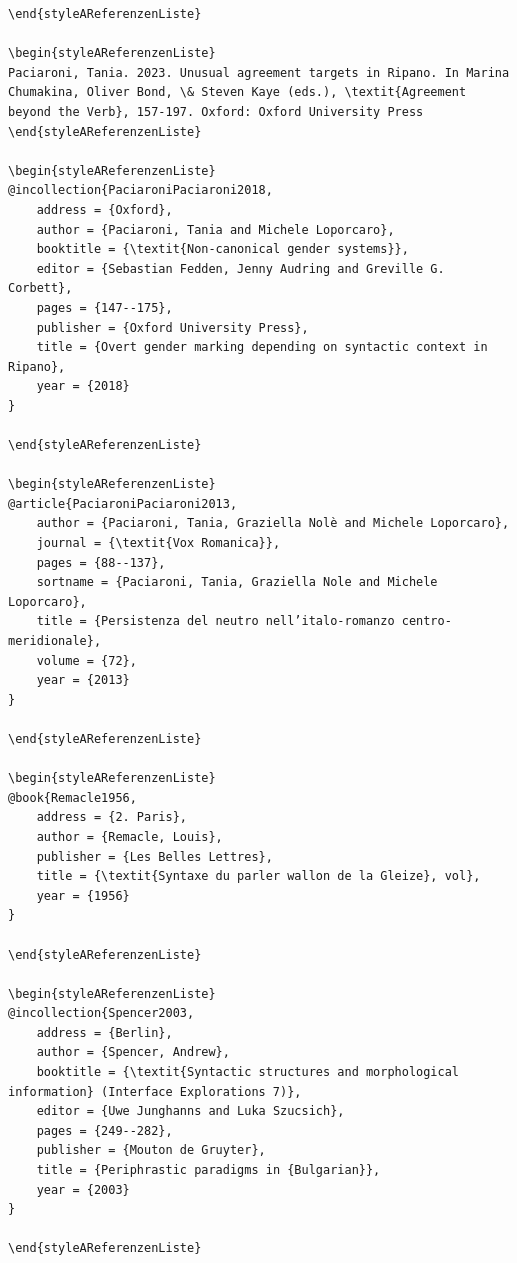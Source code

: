 \documentclass[output=paper]{langscibook}
\begin{document}
\begin{styleBiblio}
\begin{verbatim}
\end{styleAReferenzenListe}

\begin{styleAReferenzenListe}
Paciaroni, Tania. 2023. Unusual agreement targets in Ripano. In Marina Chumakina, Oliver Bond, \& Steven Kaye (eds.), \textit{Agreement beyond the Verb}, 157-197. Oxford: Oxford University Press
\end{styleAReferenzenListe}

\begin{styleAReferenzenListe}
@incollection{PaciaroniPaciaroni2018,
	address = {Oxford},
	author = {Paciaroni, Tania and Michele Loporcaro},
	booktitle = {\textit{Non-canonical gender systems}},
	editor = {Sebastian Fedden, Jenny Audring and Greville G. Corbett},
	pages = {147--175},
	publisher = {Oxford University Press},
	title = {Overt gender marking depending on syntactic context in Ripano},
	year = {2018}
}

\end{styleAReferenzenListe}

\begin{styleAReferenzenListe}
@article{PaciaroniPaciaroni2013,
	author = {Paciaroni, Tania, Graziella Nolè and Michele Loporcaro},
	journal = {\textit{Vox Romanica}},
	pages = {88--137},
	sortname = {Paciaroni, Tania, Graziella Nole and Michele Loporcaro},
	title = {Persistenza del neutro nell’italo-romanzo centro-meridionale},
	volume = {72},
	year = {2013}
}

\end{styleAReferenzenListe}

\begin{styleAReferenzenListe}
@book{Remacle1956,
	address = {2. Paris},
	author = {Remacle, Louis},
	publisher = {Les Belles Lettres},
	title = {\textit{Syntaxe du parler wallon de la Gleize}, vol},
	year = {1956}
}

\end{styleAReferenzenListe}

\begin{styleAReferenzenListe}
@incollection{Spencer2003,
	address = {Berlin},
	author = {Spencer, Andrew},
	booktitle = {\textit{Syntactic structures and morphological information} (Interface Explorations 7)},
	editor = {Uwe Junghanns and Luka Szucsich},
	pages = {249--282},
	publisher = {Mouton de Gruyter},
	title = {Periphrastic paradigms in {Bulgarian}},
	year = {2003}
}

\end{styleAReferenzenListe}


\end{verbatim}
\end{styleBiblio}
\end{document}
